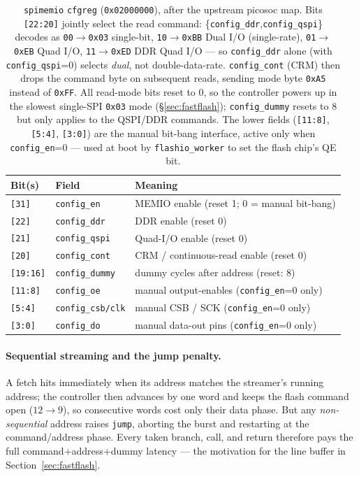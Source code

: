 \documentclass[9pt, a4paper]{extarticle}
\begin{document}
\begin{table}[htbp]
\centering\small
\begin{tabular}{@{}l l l@{}}
    \toprule
    Bit(s) & Field & Meaning \\
    \midrule
    \texttt{[31]}    & \texttt{config\_en}       & MEMIO enable (reset 1; 0 = manual bit-bang) \\
    \texttt{[22]}    & \texttt{config\_ddr}      & DDR enable (reset 0) \\
    \texttt{[21]}    & \texttt{config\_qspi}     & Quad-I/O enable (reset 0) \\
    \texttt{[20]}    & \texttt{config\_cont}     & CRM / continuous-read enable (reset 0) \\
    \texttt{[19:16]} & \texttt{config\_dummy}    & dummy cycles after address (reset: 8) \\
    \texttt{[11:8]}  & \texttt{config\_oe}       & manual output-enables (\texttt{config\_en}=0 only) \\
    \texttt{[5:4]}   & \texttt{config\_csb/clk}  & manual CSB / SCK (\texttt{config\_en}=0 only) \\
    \texttt{[3:0]}   & \texttt{config\_do}       & manual data-out pins (\texttt{config\_en}=0 only) \\
    \bottomrule
\end{tabular}
\caption{\texttt{spimemio} \texttt{cfgreg} (\texttt{0x02000000}), after the upstream picosoc map. Bits \texttt{[22:20]} jointly select the read command: \{\texttt{config\_ddr},\texttt{config\_qspi}\} decodes as \texttt{00}$\to$\texttt{0x03} single-bit, \texttt{10}$\to$\texttt{0xBB} Dual I/O (single-rate), \texttt{01}$\to$\texttt{0xEB} Quad I/O, \texttt{11}$\to$\texttt{0xED} DDR Quad I/O --- so \texttt{config\_ddr} alone (with \texttt{config\_qspi}=0) selects \emph{dual}, not double-data-rate. \texttt{config\_cont} (CRM) then drops the command byte on subsequent reads, sending mode byte \texttt{0xA5} instead of \texttt{0xFF}. All read-mode bits reset to 0, so the controller powers up in the slowest single-SPI \texttt{0x03} mode (\S\ref{sec:fastflash}); \texttt{config\_dummy} resets to 8 but only applies to the QSPI/DDR commands. The lower fields (\texttt{[11:8]}, \texttt{[5:4]}, \texttt{[3:0]}) are the manual bit-bang interface, active only when \texttt{config\_en}=0 --- used at boot by \texttt{flashio\_worker} to set the flash chip's QE bit.}
\label{tab:spimemio-cfgreg}
\end{table}

\paragraph{Sequential streaming and the jump penalty.} A fetch hits immediately when its address matches the streamer's running address; the controller then advances by one word and keeps the flash command open ($12\to9$), so consecutive words cost only their data phase. But any \emph{non-sequential} address raises \texttt{jump}, aborting the burst and restarting at the command/address phase. Every taken branch, call, and return therefore pays the full command$+$address$+$dummy latency --- the motivation for the line buffer in Section~\ref{sec:fastflash}.
\end{document}
